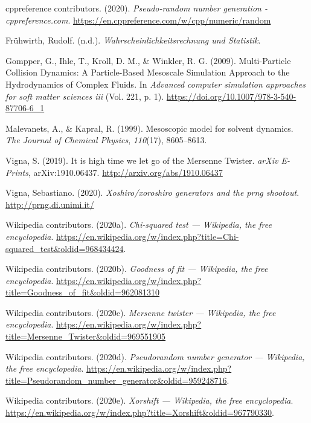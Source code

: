 \documentclass[
]{article}
\newlength{\cslhangindent}
\newenvironment{cslreferences}%
  {\setlength{\parindent}{0pt}%
  \everypar{\setlength{\hangindent}{\cslhangindent}}\ignorespaces}%
  {\par}
\begin{document}
\hypertarget{refs}{}
\begin{cslreferences}
\leavevmode\hypertarget{ref-cppreference:prng}{}%
cppreference contributors. (2020). \emph{Pseudo-random number generation
- cppreference.com}.
\url{https://en.cppreference.com/w/cpp/numeric/random}

\leavevmode\hypertarget{ref-fruehwirthstat}{}%
Frühwirth, Rudolf. (n.d.). \emph{Wahrscheinlichkeitsrechnung und
Statistik}.

\leavevmode\hypertarget{ref-winkl2009}{}%
Gompper, G., Ihle, T., Kroll, D. M., \& Winkler, R. G. (2009).
Multi-Particle Collision Dynamics: A Particle-Based Mesoscale Simulation
Approach to the Hydrodynamics of Complex Fluids. In \emph{Advanced
computer simulation approaches for soft matter sciences iii} (Vol. 221,
p. 1). \url{https://doi.org/10.1007/978-3-540-87706-6_1}

\leavevmode\hypertarget{ref-malev1999}{}%
Malevanets, A., \& Kapral, R. (1999). Mesoscopic model for solvent
dynamics. \emph{The Journal of Chemical Physics}, \emph{110}(17),
8605--8613.

\leavevmode\hypertarget{ref-vigna2019}{}%
Vigna, S. (2019). It is high time we let go of the Mersenne Twister.
\emph{arXiv E-Prints}, arXiv:1910.06437.
\url{http://arxiv.org/abs/1910.06437}

\leavevmode\hypertarget{ref-unimi:xoshiro}{}%
Vigna, Sebastiano. (2020). \emph{Xoshiro/xoroshiro generators and the
prng shootout}. \url{http://prng.di.unimi.it/}

\leavevmode\hypertarget{ref-wiki:chisquaredtest}{}%
Wikipedia contributors. (2020a). \emph{Chi-squared test --- Wikipedia,
the free encyclopedia}.
\url{https://en.wikipedia.org/w/index.php?title=Chi-squared_test\&oldid=968434424}.

\leavevmode\hypertarget{ref-wiki:goodnessoffit}{}%
Wikipedia contributors. (2020b). \emph{Goodness of fit --- Wikipedia,
the free encyclopedia}.
\url{https://en.wikipedia.org/w/index.php?title=Goodness_of_fit\&oldid=962081310}

\leavevmode\hypertarget{ref-wiki:mersennetwister}{}%
Wikipedia contributors. (2020c). \emph{Mersenne twister --- Wikipedia,
the free encyclopedia}.
\url{https://en.wikipedia.org/w/index.php?title=Mersenne_Twister\&oldid=969551905}

\leavevmode\hypertarget{ref-wiki:prng}{}%
Wikipedia contributors. (2020d). \emph{Pseudorandom number generator ---
Wikipedia, the free encyclopedia}.
\url{https://en.wikipedia.org/w/index.php?title=Pseudorandom_number_generator\&oldid=959248716}.

\leavevmode\hypertarget{ref-wiki:xorshift}{}%
Wikipedia contributors. (2020e). \emph{Xorshift --- Wikipedia, the free
encyclopedia}.
\url{https://en.wikipedia.org/w/index.php?title=Xorshift\&oldid=967790330}.
\end{cslreferences}
\end{document}

